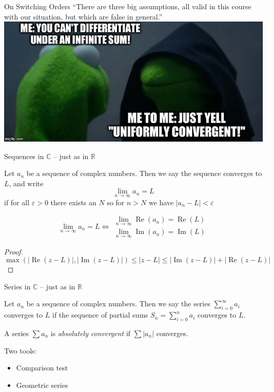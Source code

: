 \documentclass{beamer}
\newcommand{\C}{\mathbb{C}}
\newcommand{\R}{\mathbb{R}}
\DeclareMathOperator{\Real}{Re}
\DeclareMathOperator{\Imag}{Im}
\begin{document}
\begin{frame}{On Switching Orders}
``There are three big assumptions, all valid in this course with our situation, but which are false in general.''
\includegraphics[width=\textwidth,height=0.8\textheight,keepaspectratio]{UniformKermit.jpg}
\end{frame}

\begin{frame}{Sequences in $\C$ -- just as in $\R$}
\begin{definition}
Let $a_n$ be a sequence of complex numbers.  Then we say the sequence converges to $L$, and write $$\lim_{n\to\infty} a_n=L$$ if for all $\varepsilon>0$ there exists an $N$ so for $n>N$ we have $|a_n-L|<\varepsilon$
\end{definition}    
\begin{lemma} 
$$\lim_{n\to\infty} a_n=L \iff \begin{array}{c}\lim_{n\to\infty} \Real(a_n)=\Real(L) \\ \lim_{n\to\infty} \Imag(a_n)=\Imag(L)\end{array}$$
\end{lemma}
\begin{proof}
$$\max\left(|\Real(z-L)|, |\Imag(z-L)|\right)\leq |z-L|\leq|\Imag(z-L)|+|\Real(z-L )|$$
\end{proof}
\end{frame}

\begin{frame}{Series in $\C$ -- just as in $\R$}

\begin{definition}
Let $a_n$ be a sequence of complex numbers.  Then we say the series $\sum_{i=0}^\infty a_i$ converges to $L$ if the sequence of partial sums $S_n=\sum_{i=0}^n a_i$ converges to $L$.    
\end{definition}    

\begin{definition}
    A series $\sum a_n$ is \emph{absolutely convergent} if $\sum |a_n|$ converges. 
\end{definition}
\begin{block}{Two tools:}
\begin{itemize}
\item Comparison test
\item Geometric series
\end{itemize}
\end{block}


    
\end{frame}
\end{document}
